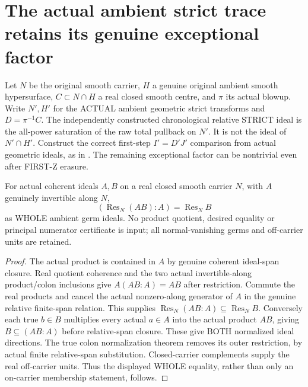 \section{The actual ambient strict trace retains its genuine exceptional factor}

Let $N$ be the original smooth carrier, $H$ a genuine original ambient
smooth hypersurface, $C\subset N\cap H$ a real closed smooth centre, and
$\pi$ its actual blowup. Write $N',H'$ for the ACTUAL ambient geometric
strict transforms and $D=\pi^{-1}C$. The independently constructed
chronological relative STRICT ideal is the all-power saturation of the
raw total pullback on $N'$. It is not the ideal of $N'\cap H'$.
Construct the correct first-step $I'=D'J'$ comparison from actual
geometric ideals, as in \cite[Remark 12.6 and proof of Theorem 12.4,
pp.~293--294]{bierstone-milman97-invent-math}. The remaining exceptional
factor can be nontrivial even after FIRST-Z erasure.

\begin{lemma}
\label{hir:sharp-actual-relative-invertible-product-colon-whole}
\leanok
For actual coherent ideals $A,B$ on a real closed smooth carrier $N$,
with $A$ genuinely invertible along $N$,
\[
 (\operatorname{Res}_N(AB):A)=\operatorname{Res}_N B
\]
as WHOLE ambient germ ideals. No product quotient, desired equality or
principal numerator certificate is input; all normal-vanishing germs and
off-carrier units are retained.
\end{lemma}
\begin{proof}
The actual product is contained in $A$ by genuine coherent ideal-span
closure. Real quotient coherence and the two actual invertible-along
product/colon inclusions give $A(AB:A)=AB$ after restriction. Commute the
real products and cancel the actual nonzero-along generator of $A$ in
the genuine relative finite-span relation. This supplies
$\operatorname{Res}_N(AB:A)\subseteq\operatorname{Res}_N B$.
Conversely each true $b\in B$ multiplies every actual $a\in A$ into the
actual product $AB$, giving $B\subseteq(AB:A)$ before relative-span
closure. These give BOTH normalized ideal directions. The true colon
normalization theorem removes its outer restriction, by actual finite
relative-span substitution. Closed-carrier complements supply the real
off-carrier units. Thus the displayed WHOLE equality, rather than only
an on-carrier membership statement, follows.
\end{proof}

